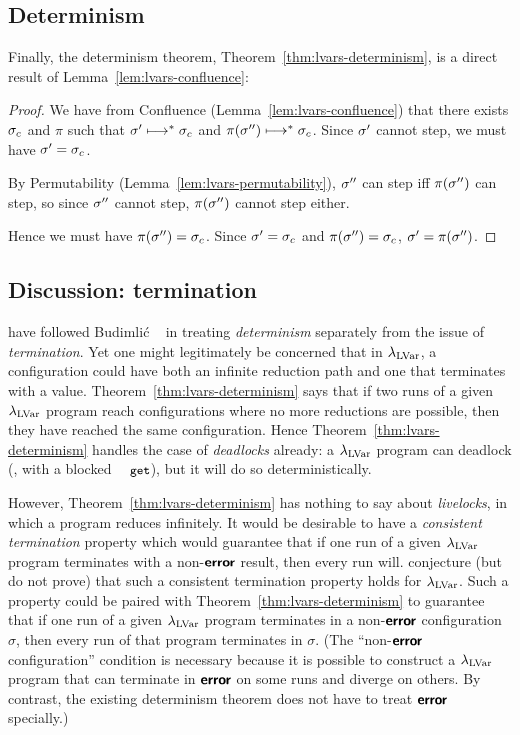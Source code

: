 \subsection{Determinism}

Finally, the determinism theorem, Theorem~\ref{thm:lvars-determinism},
is a direct result of Lemma~\ref{lem:lvars-confluence}:

\LVarsThmDeterminism
\ifdefined\DISSERTATION
\begin{proof}
  We have from Confluence (Lemma~\ref{lem:lvars-confluence}) that
  there exists $\sigma_c$ and $\pi$ such that $\sigma' \longmapsto^*
  \sigma_c$ and $\pi(\sigma'') \longmapsto^* \sigma_c$.  Since $\sigma'$
  cannot step, we must have $\sigma' = \sigma_c$.

  By Permutability (Lemma~\ref{lem:lvars-permutability}), $\sigma''$
  can step iff $\pi(\sigma'')$ can step, so since $\sigma''$ cannot
  step, $\pi(\sigma'')$ cannot step either.

  Hence we must have $\pi(\sigma'') = \sigma_c$.  Since $\sigma' =
  \sigma_c$ and $\pi(\sigma'') = \sigma_c$, $\sigma' = \pi(\sigma'')$.
\end{proof}
\fi

\subsection{Discussion: termination}

 have followed Budimli\'c \etal~ in treating
\emph{determinism} separately from the issue of \emph{termination}.
Yet one might legitimately be concerned that in $\lambda_{\textrm{LVar}}$, a
configuration could have both an infinite reduction path and one that
terminates with a value.  Theorem~\ref{thm:lvars-determinism} says
that if two runs of a given $\lambda_{\textrm{LVar}}$ program reach configurations
where no more reductions are possible, then they have reached the same
configuration.  Hence Theorem~\ref{thm:lvars-determinism} handles the
case of \emph{deadlocks} already: a $\lambda_{\textrm{LVar}}$ program can deadlock
(\eg, with a blocked $\GET$), but it will do so deterministically.

However, Theorem~\ref{thm:lvars-determinism} has nothing to say about
\emph{livelocks}, in which a program reduces infinitely.  It would be
desirable to have a \emph{consistent termination} property which would
guarantee that if one run of a given $\lambda_{\textrm{LVar}}$ program terminates
with a non-$\textbf{\textsf{error}}$ result, then every run will.   conjecture (but do
not prove) that such a consistent termination property holds for
$\lambda_{\textrm{LVar}}$.  Such a property could be paired with
Theorem~\ref{thm:lvars-determinism} to guarantee that if one run of a
given $\lambda_{\textrm{LVar}}$ program terminates in a non-$\textbf{\textsf{error}}$ configuration
$\sigma$, then every run of that program terminates in $\sigma$.  (The
``non-$\textbf{\textsf{error}}$ configuration'' condition is necessary because it is
possible to construct a $\lambda_{\textrm{LVar}}$ program that can terminate in
$\textbf{\textsf{error}}$ on some runs and diverge on others.  By contrast, the
existing determinism theorem does not have to treat $\textbf{\textsf{error}}$
specially.)
